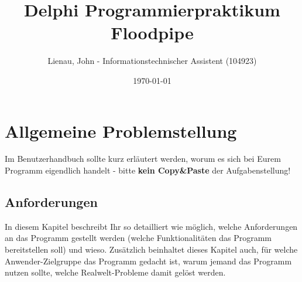 \documentclass[12pt, letterpaper]{article}
\begin{document}

    \title{Delphi Programmierpraktikum Floodpipe}
    \author{Lienau, John - Informationstechnischer Assistent (104923)}
    \date{\today}
    \maketitle
    \newpage

    \tableofcontents
    \newpage


    \section{Allgemeine Problemstellung}
        Im Benutzerhandbuch sollte kurz erläutert werden, worum es sich bei Eurem Programm eigendlich handelt
        - bitte \textbf{kein Copy\&Paste} der Aufgabenstellung!

        \subsection{Anforderungen}
            In diesem Kapitel beschreibt Ihr so detailliert wie möglich, welche Anforderungen an das Programm gestellt werden
            (welche Funktionalitäten das Programm bereitstellen soll) und wieso.
            Zusätzlich beinhaltet dieses Kapitel auch, für welche Anwender-Zielgruppe das Programm gedacht ist,
            warum jemand das Programm nutzen sollte, welche Realwelt-Probleme damit gelöst werden.
\end{document}
